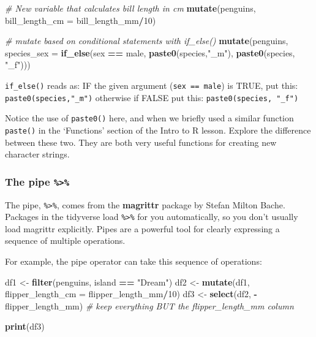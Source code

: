 \documentclass[
]{book}
\newenvironment{Shaded}{\begin{snugshade}}{\end{snugshade}}
\newcommand{\AttributeTok}[1]{\textcolor[rgb]{0.13,0.29,0.53}{#1}}
\newcommand{\CommentTok}[1]{\textcolor[rgb]{0.56,0.35,0.01}{\textit{#1}}}
\newcommand{\DecValTok}[1]{\textcolor[rgb]{0.00,0.00,0.81}{#1}}
\newcommand{\FunctionTok}[1]{\textcolor[rgb]{0.13,0.29,0.53}{\textbf{#1}}}
\newcommand{\NormalTok}[1]{#1}
\newcommand{\OtherTok}[1]{\textcolor[rgb]{0.56,0.35,0.01}{#1}}
\newcommand{\SpecialCharTok}[1]{\textcolor[rgb]{0.81,0.36,0.00}{\textbf{#1}}}
\newcommand{\StringTok}[1]{\textcolor[rgb]{0.31,0.60,0.02}{#1}}
\begin{document}
\begin{Shaded}
\begin{Highlighting}[]
\CommentTok{\# New variable that calculates bill length in cm}
\FunctionTok{mutate}\NormalTok{(penguins, }\AttributeTok{bill\_length\_cm =}\NormalTok{ bill\_length\_mm}\SpecialCharTok{/}\DecValTok{10}\NormalTok{)}

\CommentTok{\# mutate based on conditional statements with if\_else()}
\FunctionTok{mutate}\NormalTok{(penguins, }\AttributeTok{species\_sex =} \FunctionTok{if\_else}\NormalTok{(sex }\SpecialCharTok{==} \StringTok{\textquotesingle{}male\textquotesingle{}}\NormalTok{, }\FunctionTok{paste0}\NormalTok{(species,}\StringTok{"\_m"}\NormalTok{), }\FunctionTok{paste0}\NormalTok{(species, }\StringTok{"\_f"}\NormalTok{)))}
\end{Highlighting}
\end{Shaded}

\texttt{if\_else()} reads as: IF the given argument (\texttt{sex\ ==\ \textquotesingle{}male\textquotesingle{}}) is TRUE, put this: \texttt{paste0(species,"\_m")} otherwise if FALSE put this: \texttt{paste0(species,\ "\_f")}

Notice the use of \texttt{paste0()} here, and when we briefly used a similar function \texttt{paste()} in the `Functions' section of the Intro to R lesson. Explore the difference between these two. They are both very useful functions for creating new character strings.

\hypertarget{the-pipe-1}{%
\subsubsection{\texorpdfstring{The pipe \texttt{\%\textgreater{}\%}}{The pipe \%\textgreater\%}}\label{the-pipe-1}}

The pipe, \texttt{\%\textgreater{}\%}, comes from the \textbf{magrittr} package by Stefan Milton Bache. Packages in the tidyverse load \texttt{\%\textgreater{}\%} for you automatically, so you don't usually load magrittr explicitly. Pipes are a powerful tool for clearly expressing a sequence of multiple operations.

For example, the pipe operator can take this sequence of operations:

\begin{Shaded}
\begin{Highlighting}[]
\NormalTok{df1 }\OtherTok{\textless{}{-}} \FunctionTok{filter}\NormalTok{(penguins, island }\SpecialCharTok{==} \StringTok{"Dream"}\NormalTok{)}
\NormalTok{df2 }\OtherTok{\textless{}{-}} \FunctionTok{mutate}\NormalTok{(df1, }\AttributeTok{flipper\_length\_cm =}\NormalTok{ flipper\_length\_mm}\SpecialCharTok{/}\DecValTok{10}\NormalTok{)}
\NormalTok{df3 }\OtherTok{\textless{}{-}} \FunctionTok{select}\NormalTok{(df2, }\SpecialCharTok{{-}}\NormalTok{flipper\_length\_mm) }\CommentTok{\# keep everything BUT the flipper\_length\_mm column}

\FunctionTok{print}\NormalTok{(df3)}
\end{Highlighting}
\end{Shaded}
\end{document}
